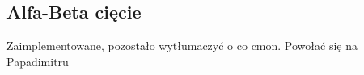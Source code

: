 \subsection{Alfa-Beta cięcie}
\label{subsec:alfa-beta-ciecie}

{
    \color{red}
    \large Zaimplementowane, pozostało wytłumaczyć o co cmon.
Powołać się na Papadimitru
}